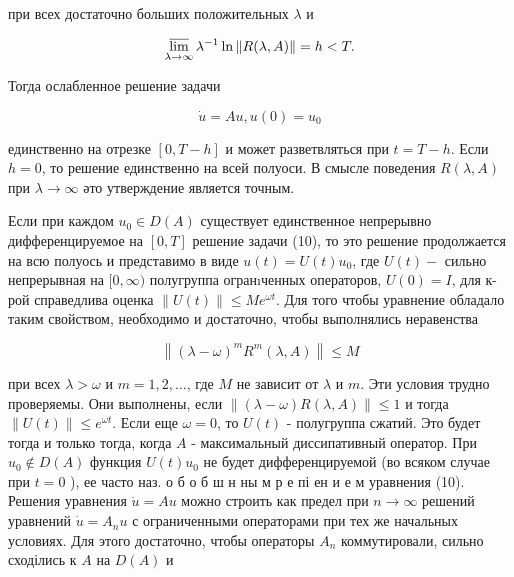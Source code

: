 \documentclass[10pt]{article}
\begin{document}
при всех достаточно больших положительных $\lambda$ и



\[

\varlimsup_{\lambda \rightarrow \infty} \lambda^{-1} \ln \|R(\lambda, A)\|=h<T .

\]



Тогда ослабленное решение задачи



\[

\dot{u}=A u, u(0)=u_{0}

\]



единственно на отрезке $[0, T-h]$ и может разветвляться при $t=T-h$. Если $h=0$, то решение единственно на всей полуоси. В смысле поведения $R(\lambda, A)$ при $\lambda \rightarrow \infty$ әто утверждение является точным.



Если при каждом $u_{0} \in D(A)$ существует единственное непрерывно дифференцируемое на $[0, T]$ решение задачи (10), то это решение продолжается на всю полуось и представимо в виде $u(t)=U(t) u_{0}$, где $U(t)-$ сильно непрерывная на $[0, \infty)$ полугруппа огранıченных операторов, $U(0)=I$, для к-рой справедлива оценка $\|U(t)\| \leqslant M e^{\omega t}$. Для того чтобы уравнение обладало таким свойством, необходимо и достаточно, чтобы выполнялись неравенства



\[

\left\|(\lambda-\omega)^{m} R^{m}(\lambda, A)\right\| \leqslant M

\]



при всех $\lambda>\omega$ и $m=1,2, \ldots$, где $M$ не зависит от $\lambda$ и $m$. Эти условия трудно проверяемы. Они выполнены, если $\|(\lambda-\omega) R(\lambda, A)\| \leqslant 1$ и тогда $\|U(t)\| \leqslant e^{\omega t}$. Если еще $\omega=0$, то $U(t)$ - полугруппа сжатий. Это будет тогда и только тогда, когда $A$ - максимальный диссипативный оператор. При $u_{0} \notin D(A)$ функция $U(t) u_{0}$ не будет дифференцируемой (во всяком случае при $t=0$ ), ее часто наз. о б о б ш н ны м р е пі ен и е м уравнения (10). Решения уравнения $\dot{u}=A u$ можно строить как предел при $n \rightarrow \infty$ решений уравнений $\dot{u}=A_{n} u$ с ограниченными операторами при тех же начальных условиях. Для этого достаточно, чтобы операторы $A_{n}$ коммутировали, сильно сходілись к $A$ на $D(A)$ и
\end{document}
